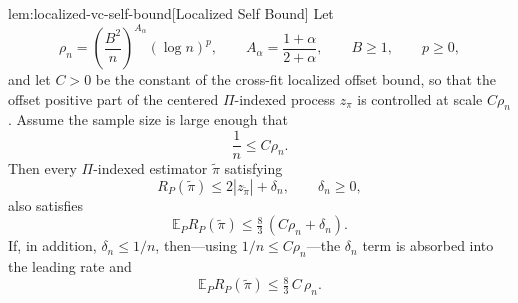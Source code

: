 \documentclass[11pt]{article}
\begin{document}
\begin{lemmav}{lem:localized-vc-self-bound}[Localized Self Bound]
Let
\[
\rho_n=\left(\frac{B^2}{n}\right)^{A_\alpha}(\log n)^p,
\qquad A_\alpha=\frac{1+\alpha}{2+\alpha},
\qquad B\ge 1,
\qquad p\ge 0,
\]
and let \(C>0\) be the constant of the cross-fit localized offset bound, so that the offset positive part of the centered \(\Pi\)-indexed process \(z_\pi\) is controlled at scale \(C\rho_n\). Assume the sample size is large enough that
\[
\frac1n\le C\rho_n .
\]
Then every \(\Pi\)-indexed estimator \(\widetilde\pi\) satisfying
\[
R_P(\widetilde\pi)\le 2|z_{\widetilde\pi}|+\delta_n,
\qquad \delta_n\ge 0,
\]
also satisfies
\[
\mathbb E_P R_P(\widetilde\pi)\le \tfrac{8}{3}\,(C\rho_n+\delta_n).
\]
If, in addition, \(\delta_n\le 1/n\), then---using \(1/n\le C\rho_n\)---the \(\delta_n\) term is absorbed into the leading rate and
\[
\mathbb E_P R_P(\widetilde\pi)\le \tfrac{8}{3}\,C\,\rho_n .
\]
\end{lemmav}
\end{document}
